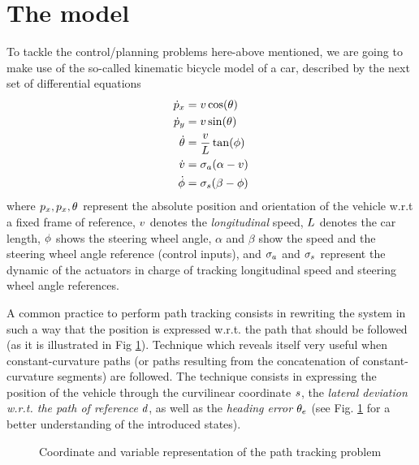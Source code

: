 \section{The model}
	To tackle the control/planning problems here-above mentioned, we are going to make use of the so-called kinematic bicycle model of a car, described by the next set of differential equations
	\begin{subequations}
	\begin{align}
		\dot{p}_x 		& = v\cos(\theta) \\
		\dot{p}_y 		& = v\sin(\theta) \\
		\dot{\theta} 		& = \frac{v}{L}\tan(\phi) \\
		\dot{v}     & = \sigma_a(\alpha-v)\\
		\dot{\phi} & = \sigma_s(\beta-\phi)
	\end{align}
	\end{subequations}
	where $p_x, p_x, \theta$ represent the absolute position and orientation of the vehicle w.r.t a fixed frame of reference, $v$ denotes the \emph{longitudinal} speed, $L$ denotes the car length,  $\phi$ shows the steering wheel angle, $\alpha$ and $\beta$ show the speed and the steering wheel angle reference (control inputs), and $\sigma_a$ and $\sigma_s$ represent the dynamic of the actuators in charge of tracking longitudinal speed and steering wheel angle references.\par
	A common practice to perform path tracking consists in rewriting the system in such a way that the position is expressed w.r.t. the path that should be followed (as it is illustrated in Fig \ref{fig:system}).
	Technique which reveals itself very useful when constant-curvature paths (or paths resulting from the concatenation of constant-curvature segments) are followed.
	The technique consists in expressing the position of the vehicle through the curvilinear coordinate $s$, the \emph{lateral deviation w.r.t. the path of reference} $d$, as well as the \emph{heading error} $\theta_e$ (see Fig. \ref{fig:system} for a better understanding of the introduced states).\par
	\begin{figure}[!h]
		\centering
		\caption{Coordinate and variable representation of the path tracking problem}
		\label{fig:system}
	\end{figure}	
